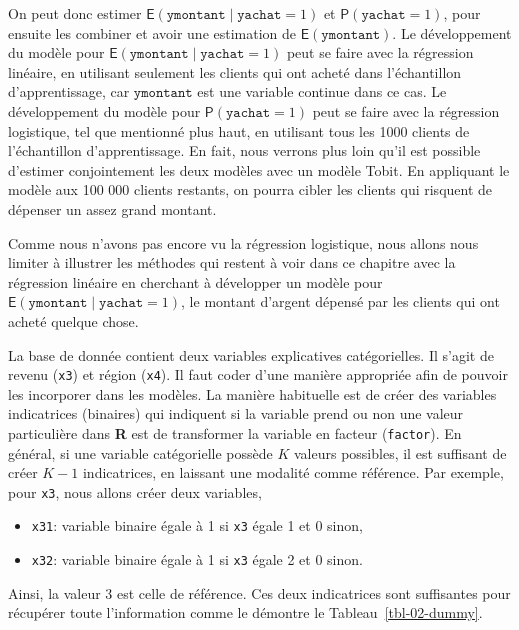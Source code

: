 \documentclass[
  11pt,
  letterpaper,
]{scrbook}
\providecommand{\tightlist}{%
  \setlength{\itemsep}{0pt}\setlength{\parskip}{0pt}}\usepackage{longtable,booktabs,array}
\theoremstyle{definition}
\theoremstyle{remark}
\begin{document}
On peut donc estimer
\(\mathsf{E}(\texttt{ymontant} \mid \texttt{yachat}=1)\) et
\(\mathsf{P}(\texttt{yachat}=1)\), pour ensuite les combiner et avoir
une estimation de \(\mathsf{E}(\texttt{ymontant})\). Le développement du
modèle pour \(\mathsf{E}(\texttt{ymontant} \mid \texttt{yachat}=1)\)
peut se faire avec la régression linéaire, en utilisant seulement les
clients qui ont acheté dans l'échantillon d'apprentissage, car
\(\texttt{ymontant}\) est une variable continue dans ce cas. Le
développement du modèle pour \(\mathsf{P}(\texttt{yachat}=1)\) peut se
faire avec la régression logistique, tel que mentionné plus haut, en
utilisant tous les 1000 clients de l'échantillon d'apprentissage. En
fait, nous verrons plus loin qu'il est possible d'estimer conjointement
les deux modèles avec un modèle Tobit. En appliquant le modèle aux 100
000 clients restants, on pourra cibler les clients qui risquent de
dépenser un assez grand montant.

Comme nous n'avons pas encore vu la régression logistique, nous allons
nous limiter à illustrer les méthodes qui restent à voir dans ce
chapitre avec la régression linéaire en cherchant à développer un modèle
pour \(\mathsf{E}(\texttt{ymontant} \mid \texttt{yachat}=1)\), le
montant d'argent dépensé par les clients qui ont acheté quelque chose.

La base de donnée contient deux variables explicatives catégorielles. Il
s'agit de revenu (\texttt{x3}) et région (\texttt{x4}). Il faut coder
d'une manière appropriée afin de pouvoir les incorporer dans les
modèles. La manière habituelle est de créer des variables indicatrices
(binaires) qui indiquent si la variable prend ou non une valeur
particulière dans \textbf{R} est de transformer la variable en facteur
(\texttt{factor}). En général, si une variable catégorielle possède
\(K\) valeurs possibles, il est suffisant de créer \(K-1\) indicatrices,
en laissant une modalité comme référence. Par exemple, pour \texttt{x3},
nous allons créer deux variables,

\begin{itemize}
\tightlist
\item
  \texttt{x31}: variable binaire égale à 1 si \texttt{x3} égale 1 et 0
  sinon,
\item
  \texttt{x32}: variable binaire égale à 1 si \texttt{x3} égale 2 et 0
  sinon.
\end{itemize}

Ainsi, la valeur 3 est celle de référence. Ces deux indicatrices sont
suffisantes pour récupérer toute l'information comme le démontre le
Tableau~\ref{tbl-02-dummy}.
\end{document}

